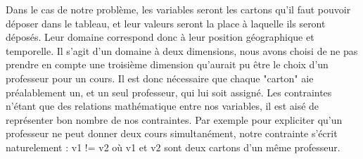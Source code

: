 \begin{center}
\end{center}

\indent

Dans le cas de notre problème, les variables seront les cartons qu'il faut pouvoir déposer dans le tableau, et leur valeurs seront la place à laquelle ils seront déposés.
Leur domaine correspond donc à leur position géographique et temporelle. 
Il s'agit d'un domaine à deux dimensions, nous avons choisi de ne pas prendre en compte une troisième dimension qu'aurait pu être le choix 
d'un professeur pour un cours. 
Il est donc nécessaire que chaque "carton" aie préalablement un, et un seul professeur, qui lui soit assigné.
Les contraintes n'étant que des relations mathématique entre nos variables, il est aisé de représenter bon nombre de nos contraintes. 
Par exemple pour expliciter qu'un professeur ne peut donner deux cours simultanément, notre contrainte s'écrit naturelement :
v1 != v2 où v1 et v2 sont deux cartons d'un même professeur.
% 
% 

